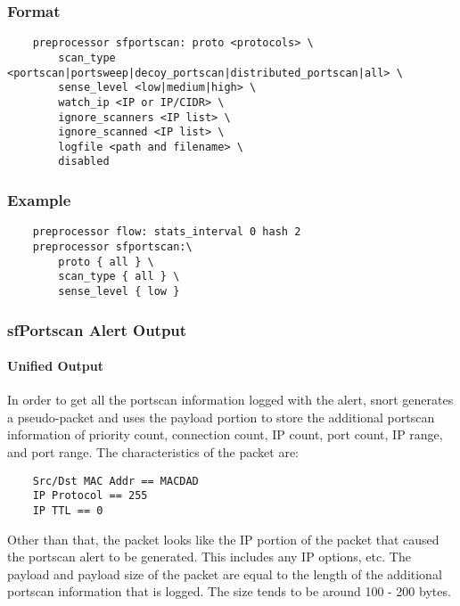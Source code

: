 \documentclass[english]{report}
\begin{document}
\subsubsection{Format}

\begin{verbatim}
    preprocessor sfportscan: proto <protocols> \
        scan_type <portscan|portsweep|decoy_portscan|distributed_portscan|all> \
        sense_level <low|medium|high> \
        watch_ip <IP or IP/CIDR> \
        ignore_scanners <IP list> \
        ignore_scanned <IP list> \
        logfile <path and filename> \
        disabled 
\end{verbatim}

\subsubsection{Example}

\begin{verbatim}
    preprocessor flow: stats_interval 0 hash 2
    preprocessor sfportscan:\
        proto { all } \
        scan_type { all } \
        sense_level { low }
\end{verbatim}

\subsubsection{sfPortscan Alert Output}

\paragraph{Unified Output}

In order to get all the portscan information logged with the alert, snort
generates a pseudo-packet and uses the payload portion to store the additional
portscan information of priority count, connection count, IP count, port count,
IP range, and port range.  The characteristics of the packet are:

\begin{verbatim}
    Src/Dst MAC Addr == MACDAD
    IP Protocol == 255
    IP TTL == 0
\end{verbatim}

Other than that, the packet looks like the IP portion of the packet that caused
the portscan alert to be generated.  This includes any IP options, etc.  The
payload and payload size of the packet are equal to the length of the
additional portscan information that is logged.  The size tends to be around
100 - 200 bytes.
\end{document}

